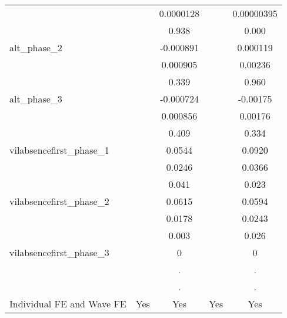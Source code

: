 {\begin{tabular}{l*{4}{c}}
                    &                     &   0.0000128         &                     &  0.00000395         \\
                    &                     &       0.938         &                     &       0.000         \\
alt\_phase\_2         &                     &   -0.000891         &                     &    0.000119         \\
                    &                     &    0.000905         &                     &     0.00236         \\
                    &                     &       0.339         &                     &       0.960         \\
alt\_phase\_3         &                     &   -0.000724         &                     &    -0.00175         \\
                    &                     &    0.000856         &                     &     0.00176         \\
                    &                     &       0.409         &                     &       0.334         \\
vilabsencefirst\_phase\_1&                     &      0.0544\sym{*}  &                     &      0.0920\sym{*}  \\
                    &                     &      0.0246         &                     &      0.0366         \\
                    &                     &       0.041         &                     &       0.023         \\
vilabsencefirst\_phase\_2&                     &      0.0615\sym{**} &                     &      0.0594\sym{*}  \\
                    &                     &      0.0178         &                     &      0.0243         \\
                    &                     &       0.003         &                     &       0.026         \\
vilabsencefirst\_phase\_3&                     &           0         &                     &           0         \\
                    &                     &           .         &                     &           .         \\
                    &                     &           .         &                     &           .         \\
Individual FE and Wave FE &         Yes         &         Yes         &         Yes         &         Yes         \\

\end{tabular}}
